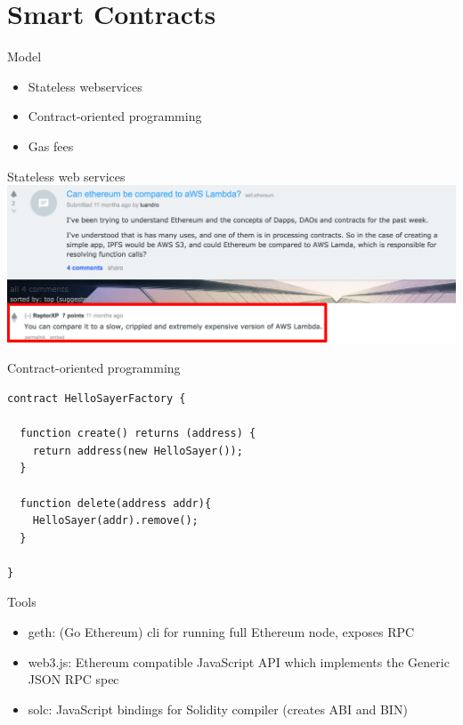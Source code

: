 \documentclass[presentation]{beamer}
\begin{document}
\section{Smart Contracts}
\label{sec-2}

\begin{frame}[label=sec-2-1]{Model}
\begin{itemize}
\item Stateless webservices
\item Contract-oriented programming
\item Gas fees
\end{itemize}
\end{frame}

\begin{frame}[label=sec-2-2]{Stateless web services}
\includegraphics[width=.9\linewidth]{../images/awslambda.png}
\end{frame}

\begin{frame}[fragile,label=sec-2-3]{Contract-oriented programming}
 \begin{verbatim}
contract HelloSayerFactory {

  function create() returns (address) {
    return address(new HelloSayer());
  }

  function delete(address addr){
    HelloSayer(addr).remove();
  }

}
\end{verbatim}
\end{frame}

\begin{frame}[label=sec-2-4]{Tools}
\begin{itemize}
\item geth: (Go Ethereum) \alert{cli} for running full Ethereum node, exposes RPC
\item web3.js: Ethereum compatible \alert{JavaScript API} which implements the Generic \alert{JSON RPC spec}
\item solc: JavaScript bindings for Solidity compiler (creates \alert{ABI} and \alert{BIN})
\end{itemize}
\end{frame}
\end{document}
